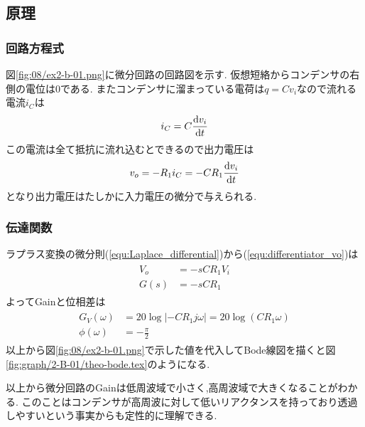 \subsection{原理}
\label{subsec:differentiator_theo}
\subsubsection{回路方程式}
図\ref{fig:08/ex2-b-01.png}に微分回路の回路図を示す.
仮想短絡からコンデンサの右側の電位は0である.
またコンデンサに溜まっている電荷は$q=Cv_i$なので流れる電流$i_C$は
\begin{align}
  i_C=C\frac{{\rm d}v_i}{{\rm d}t}
\end{align}
この電流は全て抵抗に流れ込むとできるので出力電圧は
\begin{align}
  \label{equ:differentiator_vo}
  v_o=-R_1i_C=-CR_1\frac{{\rm d}v_i}{{\rm d}t}
\end{align}
となり出力電圧はたしかに入力電圧の微分で与えられる.
\subsubsection{伝達関数}
ラプラス変換の微分則(\ref{equ:Laplace_differential})から(\ref{equ:differentiator_vo})は
\begin{align}
  \begin{split}
    V_o&=-sCR_1V_i\\
    G(s)&=-sCR_1
  \end{split}
\end{align}
よってGainと位相差は
\begin{align}
  \begin{split}
    G_V(\omega)&=20\log\left|-CR_1j\omega\right|=20\log(CR_1\omega)\\
    \phi(\omega)&=-\frac{\pi}{2}
  \end{split}
\end{align}
以上から図\ref{fig:08/ex2-b-01.png}で示した値を代入してBode線図を描くと図\ref{fig:graph/2-B-01/theo-bode.tex}のようになる.

以上から微分回路のGainは低周波域で小さく,高周波域で大きくなることがわかる.
このことはコンデンサが高周波に対して低いリアクタンスを持っており透過しやすいという事実からも定性的に理解できる.
